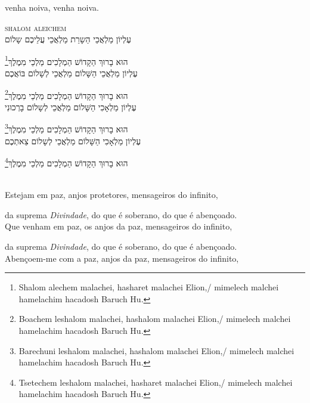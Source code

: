 venha noiva, venha noiva.

\movetoevenpage
\raggedleft
{}

\vspace*{1cm}

\textsc{shalom aleichem}\\[15pt]

עֶלְיוֹן מַלְאֲכֵי הַשָרֵת מַלְאֲכֵי עֲלֵיכֶם שָלוֹם

הוּא בָרוּךְ הַקָדוֹשׁ הַמְלָכִים מַלְכֵי מִמֶלֶךְ\footnote{Shalom alechem malachei, hasharet malachei Elion,/
mimelech malchei hamelachim hacadosh Baruch Hu.}\\[10pt]

עֶלְיוֹן מַלְאֲכֵי הַשָּׁלוֹם מַלְאֲכֵי לְשָׁלוֹם בּוֹאֲכֶם

הוּא בָרוּךְ הַקָדוֹשׁ הַמְלָכִים מַלְכֵי מִמֶלֶךְ\footnote{Boachem leshalom malachei, hashalom malachei Elion,/
mimelech malchei hamelachim hacadosh Baruch Hu.}\\[10pt]

עֶלְיוֹן מַלְאָכִי הַשָּׁלוֹם מַלְאֲכֵי לְשָלוֹם בָרְכוּנִי

הוּא בָרוּךְ הַקָדוֹשׁ הַמְלָכִים מַלְכֵי מִמֶלֶךְ\footnote{Barechuni leshalom malachei, hashalom malachei Elion,/
mimelech malchei hamelachim hacadosh Baruch Hu.}\\[10pt] 

עֶלְיוֹן מַלְאָכִי הַשָּׁלוֹם מַלְאֲכֵי לְשָלוֹם צֵאתְכֶם 

הוּא בָרוּךְ הַקָדוֹשׁ הַמְלָכִים מַלְכֵי מִמֶלֶךְ\footnote{Tsetechem leshalom malachei, hasharet malachei Elion,/
mimelech malchei hamelachim hacadosh Baruch Hu.} 


\movetooddpage
\raggedright

\vspace*{1cm}

\textsc{}\\[15pt]

Estejam em paz, anjos protetores, mensageiros do infinito,

da suprema \emph{Divindade},  do que é soberano, do que é \qb{}abençoado.\\[10pt]

Que venham em paz, os anjos da paz, mensageiros do \qb{}infinito,

da suprema \emph{Divindade}, do que é soberano, do que é \qb{}abençoado.\\[10pt]

Abençoem-me com a paz, anjos da paz, mensageiros do \qb{}infinito,

